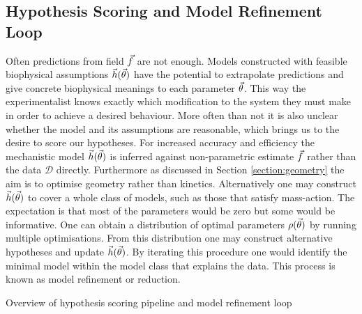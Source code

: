 \subsection{Hypothesis Scoring and Model Refinement Loop}
\label{section:refinement}
Often predictions from field $\vec{f}$ are not enough. Models constructed
with feasible biophysical assumptions $\vec{h}(\vec{\theta})$ have the potential
to extrapolate predictions and give concrete biophysical meanings to each parameter $\vec{\theta}$.
This way the experimentalist knows exactly which modification to the system they must
make in order to achieve a desired behaviour. More often than not it is also unclear
whether the model and its assumptions are reasonable, which brings us to the desire
to score our hypotheses. For increased
accuracy and efficiency \cite{Meeds2019EfficientSystems} the mechanistic model
$\vec{h}(\vec{\theta})$ is inferred against non-parametric estimate $\vec{f}$
rather than the data $\mathcal{D}$ directly. Furthermore as discussed in Section
\ref{section:geometry} the aim is to optimise geometry rather than kinetics.
Alternatively one may construct $\vec{h}(\vec{\theta})$ to cover a whole class
of models, such as those that satisfy mass-action. The expectation is that most of the
parameters would be zero but some would be informative. One can obtain a distribution
of optimal parameters $\rho(\vec{\theta})$ by running multiple optimisations. From
this distribution one may construct alternative hypotheses and update $\vec{h}(\vec{\theta})$.
By iterating this procedure one would identify the minimal model within the model class that
explains the data. This process is known as model refinement or reduction.

\begin{Figure}
    \caption{Overview of hypothesis scoring pipeline and model refinement loop}
    \label{fig:non-parametric}
\end{Figure}


